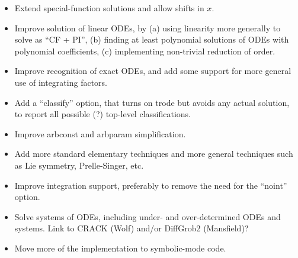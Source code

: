 \begin{itemize}

\item
Extend special-function solutions and allow shifts in $x$.

\item
Improve solution of linear ODEs, by (a) using linearity more generally
to solve as ``CF + PI'', (b) finding at least polynomial solutions of
ODEs with polynomial coefficients, (c) implementing non-trivial
reduction of order.

\item
Improve recognition of exact ODEs, and add some support for more
general use of integrating factors.

\item
Add a ``classify'' option, that turns on trode but avoids any actual
solution, to report all possible (\@?) top-level classifications.

\item
Improve arbconst and arbparam simplification.

\item
Add more standard elementary techniques and more general techniques
such as Lie symmetry, Prelle-Singer, etc.

\item
Improve integration support, preferably to remove the need for the
``noint'' option.

\item
Solve systems of ODEs, including under- and over-determined ODEs and
systems.  Link to CRACK (Wolf) and/or DiffGrob2 (Mansfield)?

\item
Move more of the implementation to symbolic-mode code.

\end{itemize}


